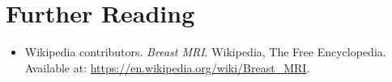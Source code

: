 \section{Further Reading}
\begin{itemize}
  \item Wikipedia contributors. \textit{Breast MRI}. Wikipedia, The Free Encyclopedia. Available at: \url{https://en.wikipedia.org/wiki/Breast_MRI}.
\end{itemize}
